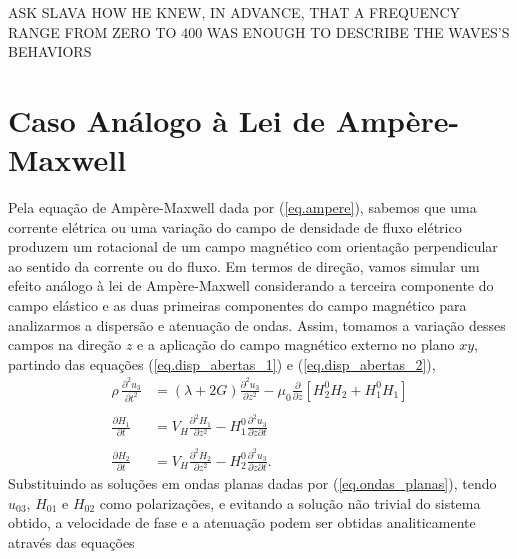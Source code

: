 ASK SLAVA HOW HE KNEW, IN ADVANCE, THAT A FREQUENCY RANGE FROM ZERO TO 400 WAS ENOUGH TO DESCRIBE THE WAVES'S BEHAVIORS 

\section{Caso An\'alogo \`a Lei de Amp\`ere-Maxwell}\label{sec.ampere_maxwell_law}
Pela equa\c{c}\~ao de Amp\`ere-Maxwell dada por (\ref{eq.ampere}), sabemos que uma corrente el\'etrica ou uma varia\c{c}\~ao do campo de densidade de fluxo el\'etrico produzem um rotacional de um campo magn\'etico com orienta\c{c}\~ao perpendicular ao sentido da corrente ou do fluxo. Em termos de dire\c{c}\~ao, vamos simular um efeito an\'alogo \`a lei de Amp\`ere-Maxwell considerando a terceira componente do campo el\'astico e as duas primeiras componentes do campo magn\'etico para analizarmos a dispers\~ao e atenua\c{c}\~ao de ondas. Assim, tomamos a varia\c{c}\~ao desses campos na dire\c{c}\~ao $z$ e a aplica\c{c}\~ao do campo magn\'etico externo no plano $xy$, partindo das equa\c{c}\~oes (\ref{eq.disp_abertas_1}) e (\ref{eq.disp_abertas_2}),
\begin{align*}
\rho\,\frac{\partial^2u_3}{\partial t^2}&=(\lambda+2G)\frac{\partial^2u_3}{\partial z^2}-\mu_0\frac{\partial}{\partial z}\left[H^0_2H_2+H^0_1H_1\right]\\\\
\frac{\partial H_1}{\partial t}&=V_H\frac{\partial^2H_1}{\partial z^2}-H^0_1\frac{\partial^2u_3}{\partial z\partial t}\\\\
\frac{\partial H_2}{\partial t}&=V_H\frac{\partial^2H_2}{\partial z^2}-H^0_2\frac{\partial^2u_3}{\partial z\partial t}.
\end{align*}   
Substituindo as solu\c{c}\~oes em ondas planas dadas por (\ref{eq.ondas_planas}), tendo $u_{03}$, $H_{01}$ e $H_{02}$ como polariza\c{c}\~oes, e evitando a solu\c{c}\~ao n\~ao trivial do sistema obtido, a velocidade de fase e a atenua\c{c}\~ao podem ser obtidas analiticamente atrav\'es das equa\c{c}\~oes
